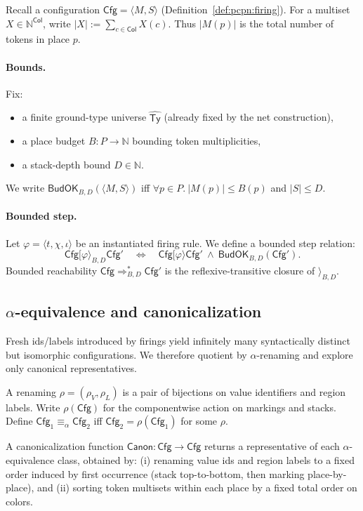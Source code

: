 \documentclass[runningheads]{llncs}
\newcommand{\Canon}{\mathsf{Canon}}
\newcommand{\Cfg}{\mathsf{Cfg}}
\begin{document}
Recall a configuration $\Cfg=\langle M,S\rangle$ (Definition~\ref{def:pcpn:firing}).
For a multiset $X\in\mathbb{N}^{\mathsf{Col}}$, write $|X|:=\sum_{c\in\mathsf{Col}}X(c)$.
Thus $|M(p)|$ is the total number of tokens in place $p$.

\paragraph{Bounds.}
Fix:
\begin{itemize}
  \item a finite ground-type universe $\widehat{\mathsf{Ty}}$ (already fixed by the net construction),
  \item a place budget $B:P\to\mathbb{N}$ bounding token multiplicities,
  \item a stack-depth bound $D\in\mathbb{N}$.
\end{itemize}
We write $\mathsf{BudOK}_{B,D}(\langle M,S\rangle)$ iff
$\forall p\in P.\ |M(p)|\le B(p)$ and $|S|\le D$.

\paragraph{Bounded step.}
Let $\varphi=\langle t,\chi,\iota\rangle$ be an instantiated firing rule.
We define a bounded step relation:
\[
\Cfg[\varphi\rangle_{B,D}\Cfg'
\quad\Longleftrightarrow\quad
\Cfg[\varphi\rangle\Cfg' \ \wedge\ \mathsf{BudOK}_{B,D}(\Cfg').
\]
Bounded reachability $\Cfg \Rightarrow^{*}_{B,D} \Cfg'$ is the reflexive-transitive closure of $\rangle_{B,D}$.

\subsection{$\alpha$-equivalence and canonicalization}
\label{sec:analysis:canon}

Fresh ids/labels introduced by firings yield infinitely many syntactically distinct but isomorphic configurations.
We therefore quotient by $\alpha$-renaming and explore only canonical representatives.

A renaming $\rho=(\rho_V,\rho_L)$ is a pair of bijections on value identifiers and region labels.
Write $\rho(\Cfg)$ for the componentwise action on markings and stacks.
Define $\Cfg_1\equiv_\alpha \Cfg_2$ iff $\Cfg_2=\rho(\Cfg_1)$ for some $\rho$.

\begin{definition}
\label{def:canon}
A canonicalization function $\Canon:\Cfg\to\Cfg$ returns a representative of each $\alpha$-equivalence class,
obtained by:
(i) renaming value ids and region labels to a fixed order induced by first occurrence (stack top-to-bottom,
then marking place-by-place), and
(ii) sorting token multisets within each place by a fixed total order on colors.
\end{definition}
\end{document}
